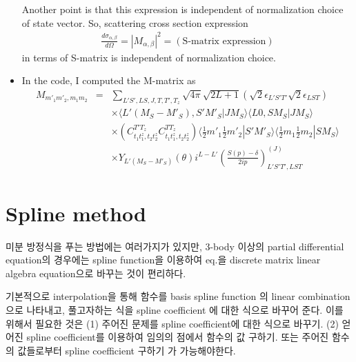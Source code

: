 \documentclass[10pt]{book}
\newcommand{\bea}{\begin{eqnarray}}
\newcommand{\eea}{\end{eqnarray}}
\newcommand{\no}{\nonumber \\}
\def\la{\langle}
\def\ra{\rangle}
\begin{document}
\begin{itemize}
Another point is that this expression is independent of normalization choice of state vector. So, scattering cross section expression
\bea
\frac{d\sigma_{\alpha,\beta}}{d\Omega}=|M_{\alpha,\beta}|^2
 =(\mbox{S-matrix expression})
\eea
in terms of S-matrix is independent of normalization choice.

\item In the code, I computed the M-matrix as
\bea 
M_{m'_1 m'_2, m_1 m_2}&=&\sum_{L'S',LS, J,T,T',T_z}
                       \sqrt{4\pi}\sqrt{2L+1}  \left(\sqrt{2}\epsilon_{L'S'T'}\sqrt{2}\epsilon_{LST}\right)
                       \no & & \times 
                       \la L' (M_S-M'_S),S' M'_S|J M_S\ra
                       \la L0,S M_S|J M_S\ra
                       \no & & \times 
                      \left( C^{T'T_z}_{t_1 t_1^z,t_2 t_2^z}C^{T T_z}_{t_1 t_1^z,t_2 t_2^z}\right) 
                      \la \frac{1}{2} m'_1 \frac{1}{2} m'_2|S' M'_S\ra  
                      \la \frac{1}{2} m_1 \frac{1}{2} m_2|S M_S\ra 
                      \no & & \times 
                      Y_{L'(M_S-M'_S)}(\theta)
                      i^{L-L'}
                      \left( \frac{S(p)-\delta}{2 ip} \right)_{L'S'T', LST}^{(J)} 
\eea 

\end{itemize}
\newpage

\section{Spline method}



미분 방정식을 푸는 방법에는 여러가지가 있지만, 3-body 이상의
partial differential equation의 경우에는 spline function을 
이용하여 eq.을 discrete matrix linear algebra equation으로 
바꾸는 것이 편리하다.

기본적으로 interpolation을 통해 함수를 basis spline function 의 linear combination으로 나타내고,
풀고자하는 식을 spline coefficient 에 대한 식으로 바꾸어 준다. 
이를 위해서 필요한 것은 (1) 주어진 문제를 spline coefficient에 대한 식으로 바꾸기.
(2) 얻어진 spline coefficient를 이용하여 임의의 점에서 함수의 값 구하기. 
또는 주어진 함수의 값들로부터 spline coefficient 구하기 가 가능해야한다. 
\end{document}
